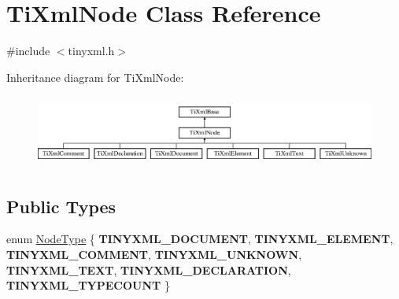 \hypertarget{class_ti_xml_node}{}\section{Ti\+Xml\+Node Class Reference}
\label{class_ti_xml_node}


{\ttfamily \#include $<$tinyxml.\+h$>$}

Inheritance diagram for Ti\+Xml\+Node\+:\begin{figure}[H]
\begin{center}
\leavevmode
\includegraphics[height=2.413793cm]{class_ti_xml_node}
\end{center}
\end{figure}
\subsection*{Public Types}
\begin{DoxyCompactItemize}
\item 
enum \hyperlink{class_ti_xml_node_a836eded4920ab9e9ef28496f48cd95a2}{Node\+Type} \{ \newline
{\bfseries T\+I\+N\+Y\+X\+M\+L\+\_\+\+D\+O\+C\+U\+M\+E\+NT}, 
{\bfseries T\+I\+N\+Y\+X\+M\+L\+\_\+\+E\+L\+E\+M\+E\+NT}, 
{\bfseries T\+I\+N\+Y\+X\+M\+L\+\_\+\+C\+O\+M\+M\+E\+NT}, 
{\bfseries T\+I\+N\+Y\+X\+M\+L\+\_\+\+U\+N\+K\+N\+O\+WN}, 
\newline
{\bfseries T\+I\+N\+Y\+X\+M\+L\+\_\+\+T\+E\+XT}, 
{\bfseries T\+I\+N\+Y\+X\+M\+L\+\_\+\+D\+E\+C\+L\+A\+R\+A\+T\+I\+ON}, 
{\bfseries T\+I\+N\+Y\+X\+M\+L\+\_\+\+T\+Y\+P\+E\+C\+O\+U\+NT}
 \}
\end{DoxyCompactItemize}
